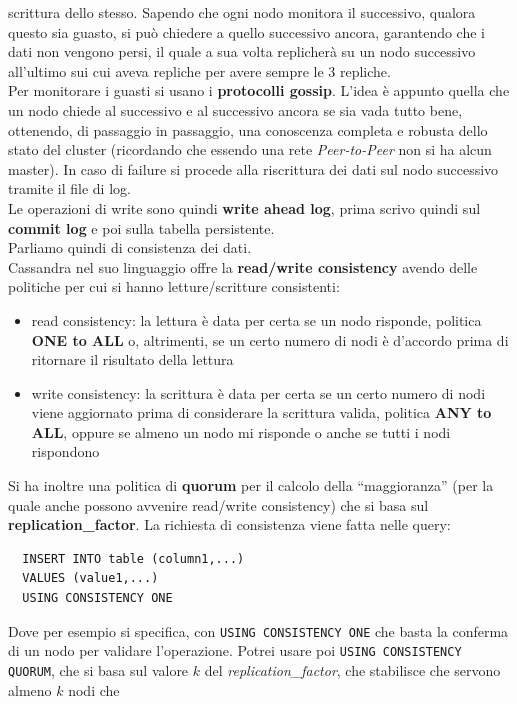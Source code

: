 \documentclass[a4paper,12pt, oneside]{book}
\begin{document}
scrittura dello stesso. Sapendo che ogni nodo monitora il successivo, qualora
questo sia guasto, si può chiedere a quello successivo ancora, garantendo che i
dati non vengono persi, il quale a sua volta replicherà su un nodo successivo
all'ultimo sui cui aveva repliche per avere sempre le 3 repliche. \\
Per monitorare i guasti si usano i \textbf{protocolli gossip}. L'idea è appunto
quella che un nodo chiede al successivo e al successivo ancora se sia vada tutto
bene, ottenendo, di passaggio in passaggio, una conoscenza completa e robusta
dello stato del cluster (ricordando che essendo una rete \textit{Peer-to-Peer}
non si ha alcun master). In caso di failure si procede alla riscrittura dei
dati sul nodo successivo tramite il file di log.\\
Le operazioni di write sono quindi \textbf{write ahead log}, prima scrivo quindi
sul \textbf{commit log} e poi sulla tabella persistente.\\
Parliamo quindi di consistenza dei dati.\\
Cassandra nel suo linguaggio offre la \textbf{read/write consistency} avendo
delle politiche per cui si hanno letture/scritture consistenti:
\begin{itemize}
  \item read consistency: la lettura è data per certa se un nodo risponde,
  politica \textbf{ONE to ALL} o, altrimenti, se un certo numero di nodi è
  d'accordo prima di ritornare il risultato della lettura
  \item write consistency: la scrittura è data per certa se un certo numero di
  nodi viene aggiornato prima di considerare la scrittura valida, politica
  \textbf{ANY to ALL}, oppure se
  almeno un nodo mi risponde o anche se tutti i nodi rispondono
\end{itemize}
Si ha inoltre una politica di \textbf{quorum} per il calcolo della
``maggioranza'' (per la quale anche possono avvenire read/write consistency) che
si basa sul \textbf{replication\_factor}. La richiesta di consistenza viene
fatta nelle query:
\begin{verbatim}
  INSERT INTO table (column1,...)
  VALUES (value1,...)
  USING CONSISTENCY ONE
\end{verbatim}
Dove per esempio si specifica, con \texttt{USING CONSISTENCY ONE} che basta la
conferma di un nodo per validare l'operazione. Potrei usare poi  \texttt{USING
  CONSISTENCY QUORUM}, che si basa sul valore $k$ del
\textit{replication\_factor}, che stabilisce che servono almeno $k$ nodi che
\end{document}
